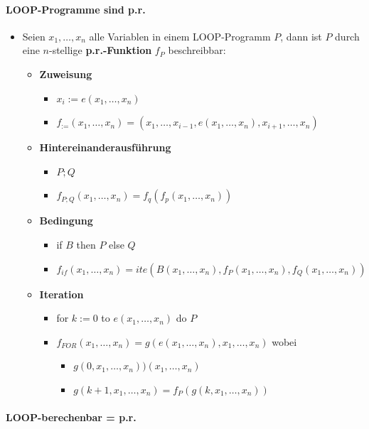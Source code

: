 \documentclass{scrartcl}
\begin{document}
\paragraph{LOOP-Programme sind p.r.}

\begin{itemize}
	\item Seien $x_1,\ldots,x_n$ alle Variablen in einem LOOP-Programm $P$, dann ist $P$ durch eine $n$-stellige \textbf{p.r.-Funktion} $f_P$ beschreibbar:
	\begin{itemize}
		\item \textbf{Zuweisung}
		\begin{itemize}
			\item $x_i := e(x_1,\ldots,x_n)$
			\item $f_{:=}(x_1,\ldots,x_n) = (x_1,\ldots,x_{i-1},e(x_1,\ldots,x_n),x_{i+1},\ldots,x_n)$
		\end{itemize}
		\item \textbf{Hintereinanderausführung}
		\begin{itemize}
			\item $P;Q$
			\item $f_{P;Q}(x_1,\ldots,x_n) = f_q(f_p(x_1,\ldots,x_n))$
		\end{itemize}
		\item \textbf{Bedingung}
		\begin{itemize}
			\item if $B$ then $P$ else $Q$
			\item $f_{if}(x_1,\ldots,x_n) = ite(B(x_1,\ldots,x_n),f_P(x_1,\ldots,x_n),f_Q(x_1,\ldots,x_n))$
		\end{itemize}
		\item \textbf{Iteration}
		\begin{itemize}
			\item for $k := 0$ to $e(x_1,\ldots,x_n)$ do $P$
			\item $f_{FOR}(x_1,\ldots,x_n) = g(e(x_1,\ldots,x_n),x_1,\ldots,x_n)$ wobei
			\begin{itemize}
				\item $g(0,x_1,\ldots,x_n) ) (x_1,\ldots,x_n)$
				\item $g(k+1,x_1,\ldots,x_n) = f_P(g(k,x_1,\ldots,x_n))$
			\end{itemize}
		\end{itemize}
	\end{itemize}
\end{itemize}

\paragraph{LOOP-berechenbar = p.r.}
\end{document}
